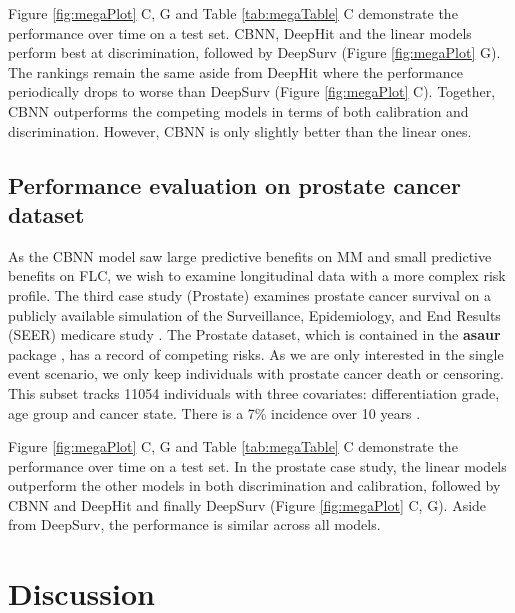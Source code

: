 \documentclass[preprint,12pt]{elsarticle}
\begin{document}
Figure \ref{fig:megaPlot} C, G and Table \ref{tab:megaTable} C demonstrate the performance over time on a test set. CBNN, DeepHit and the linear models perform best at
discrimination, followed by DeepSurv (Figure \ref{fig:megaPlot} G). The rankings remain the same aside from DeepHit where the performance periodically drops to worse
than DeepSurv (Figure \ref{fig:megaPlot} C). Together, CBNN outperforms the competing models in terms of both calibration and discrimination.
However, CBNN is only slightly better than the linear ones.

\hypertarget{pe-prostate}{%
\subsection{Performance evaluation on prostate cancer dataset}\label{pe-prostate}}
As the CBNN model saw large predictive benefits on MM and small predictive benefits on FLC, we wish to examine longitudinal data with a more complex risk profile.
The third case study (Prostate) examines prostate cancer survival on a publicly available simulation of the Surveillance, Epidemiology, and End Results (SEER) medicare study \citep{prostate}.
The Prostate dataset, which is contained in the \textbf{asaur} package \citep{asaur}, has a record of competing risks. As we are only interested in the single event scenario,
we only keep individuals with prostate cancer death or censoring. This subset tracks 11054 individuals with three covariates: differentiation grade, age group and cancer
state. There is a 7\% incidence over 10 years \citep{prostate}.

Figure \ref{fig:megaPlot} C, G and Table \ref{tab:megaTable} C demonstrate the performance over time on a test set. In the prostate case study, the linear models outperform the other
models in both discrimination and calibration, followed by CBNN and DeepHit and finally DeepSurv (Figure \ref{fig:megaPlot} C, G). Aside from DeepSurv, the performance is
similar across all models.





\hypertarget{discussion}{%
\section{Discussion}\label{discussion}}
\end{document}

